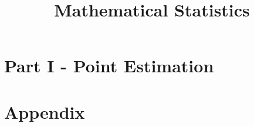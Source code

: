 \documentclass[nocolor]{report}
\title{Mathematical Statistics}
\begin{document}
    \maketitle
    \tableofcontents
    \newpage
    \chapter{Part I - Point Estimation}
    
    \newpage
    
    
    \chapter{Appendix}
    

    
\end{document}
